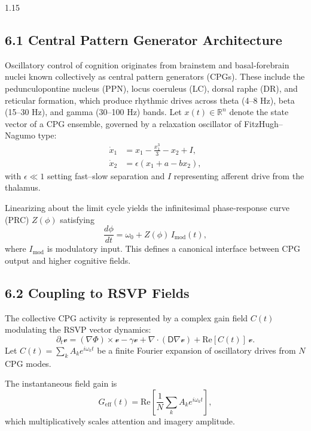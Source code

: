 \documentclass[12pt,a4paper]{article}
\begin{document}
\begin{spacing}{1.15}
\subsection{6.1 Central Pattern Generator Architecture}

Oscillatory control of cognition originates from brainstem and basal‐forebrain nuclei known collectively as central pattern generators (CPGs).  
These include the pedunculopontine nucleus (PPN), locus coeruleus (LC), dorsal raphe (DR), and reticular formation, which produce rhythmic drives across theta (4–8 Hz), beta (15–30 Hz), and gamma (30–100 Hz) bands.  
Let $x(t)\!\in\!\mathbb{R}^n$ denote the state vector of a CPG ensemble, governed by a relaxation oscillator of FitzHugh–Nagumo type:
\begin{align}
\dot x_1 &= x_1 - \tfrac{x_1^3}{3} - x_2 + I,\\
\dot x_2 &= \epsilon(x_1 + a - b x_2),
\end{align}
with $\epsilon\!\ll\!1$ setting fast–slow separation and $I$ representing afferent drive from the thalamus.  

Linearizing about the limit cycle yields the infinitesimal phase‐response curve (PRC) $Z(\phi)$ satisfying
\[
\frac{d\phi}{dt} = \omega_0 + Z(\phi)\,I_{\mathrm{mod}}(t),
\]
where $I_{\mathrm{mod}}$ is modulatory input.  This defines a canonical interface between CPG output and higher cognitive fields.

\subsection{6.2 Coupling to RSVP Fields}

The collective CPG activity is represented by a complex gain field $C(t)$ modulating the RSVP vector dynamics:
\begin{equation}
\partial_t \boldsymbol{\mathcal v}
 = (\nabla \Phi)\!\times\!\boldsymbol{\mathcal v}
   - \gamma \boldsymbol{\mathcal v}
   + \nabla\!\cdot\!(\mathsf D \nabla \boldsymbol{\mathcal v})
   + \mathrm{Re}[C(t)]\,\boldsymbol{\mathcal v}.
\label{eq:vcp}
\end{equation}
Let $C(t)=\sum_k A_k e^{i\omega_k t}$ be a finite Fourier expansion of oscillatory drives from $N$ CPG modes.

\begin{definition}
The instantaneous field gain is
\[
G_{\mathrm{eff}}(t)
 = \mathrm{Re}\!\left[\frac{1}{N}\sum_k A_k e^{i\omega_k t}\right],
\]
which multiplicatively scales attention and imagery amplitude.
\end{definition}


\end{spacing}
\end{document}

